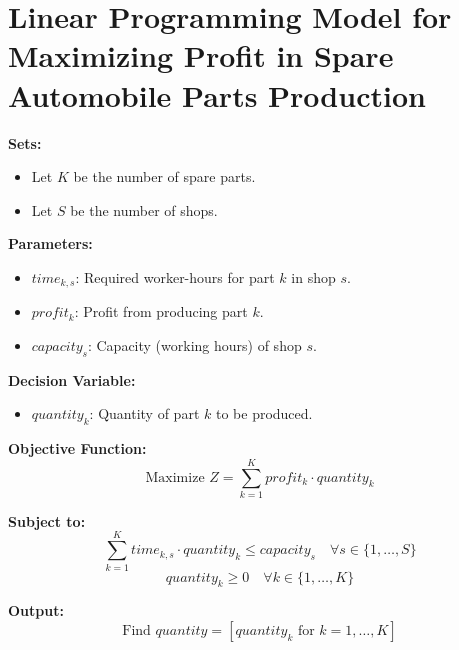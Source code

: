\documentclass{article}
\begin{document}
\section*{Linear Programming Model for Maximizing Profit in Spare Automobile Parts Production}

\textbf{Sets:}
\begin{itemize}
    \item Let \( K \) be the number of spare parts.
    \item Let \( S \) be the number of shops.
\end{itemize}

\textbf{Parameters:}
\begin{itemize}
    \item \( time_{k,s} \): Required worker-hours for part \( k \) in shop \( s \).
    \item \( profit_{k} \): Profit from producing part \( k \).
    \item \( capacity_{s} \): Capacity (working hours) of shop \( s \).
\end{itemize}

\textbf{Decision Variable:}
\begin{itemize}
    \item \( quantity_{k} \): Quantity of part \( k \) to be produced.
\end{itemize}

\textbf{Objective Function:}
\[
\text{Maximize } Z = \sum_{k=1}^{K} profit_{k} \cdot quantity_{k}
\]

\textbf{Subject to:}
\[
\sum_{k=1}^{K} time_{k,s} \cdot quantity_{k} \leq capacity_{s} \quad \forall s \in \{1, \ldots, S\}
\]
\[
quantity_{k} \geq 0 \quad \forall k \in \{1, \ldots, K\}
\]

\textbf{Output:}
\[
\text{Find } quantity = [quantity_{k} \text{ for } k = 1, \ldots, K]
\]
\end{document}
